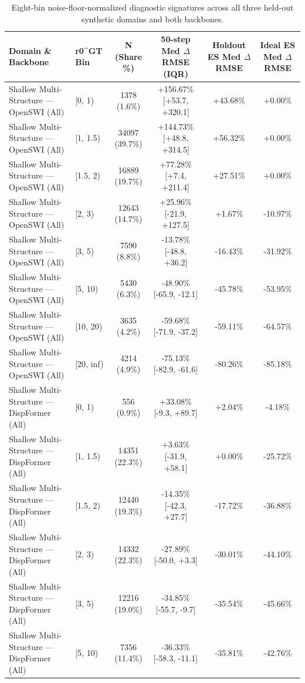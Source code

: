 \begin{table}[t]
\centering
\scriptsize
\caption{Eight-bin noise-floor-normalized diagnostic signatures across all three held-out synthetic domains and both backbones.}
\label{tab:supp_signature_bins}
\begin{tabular}{llcccc}
\toprule
Domain \& Backbone & r0^GT Bin & N (Share \%) & 50-step Med $\Delta$RMSE (IQR) & Holdout ES Med $\Delta$RMSE & Ideal ES Med $\Delta$RMSE \\
\midrule
Shallow Multi-Structure — OpenSWI (All) & [0, 1) & 1378 (1.6\%) & +156.67\% [+53.7, +320.1] & +43.68\% & +0.00\% \\
Shallow Multi-Structure — OpenSWI (All) & [1, 1.5) & 34097 (39.7\%) & +144.73\% [+48.8, +314.5] & +56.32\% & +0.00\% \\
Shallow Multi-Structure — OpenSWI (All) & [1.5, 2) & 16889 (19.7\%) & +77.28\% [+7.4, +211.4] & +27.51\% & +0.00\% \\
Shallow Multi-Structure — OpenSWI (All) & [2, 3) & 12643 (14.7\%) & +25.96\% [-21.9, +127.5] & +1.67\% & -10.97\% \\
Shallow Multi-Structure — OpenSWI (All) & [3, 5) & 7590 (8.8\%) & -13.78\% [-48.8, +36.2] & -16.43\% & -31.92\% \\
Shallow Multi-Structure — OpenSWI (All) & [5, 10) & 5430 (6.3\%) & -48.90\% [-65.9, -12.1] & -45.78\% & -53.95\% \\
Shallow Multi-Structure — OpenSWI (All) & [10, 20) & 3635 (4.2\%) & -59.68\% [-71.9, -37.2] & -59.11\% & -64.57\% \\
Shallow Multi-Structure — OpenSWI (All) & [20, inf) & 4214 (4.9\%) & -75.13\% [-82.9, -61.6] & -80.26\% & -85.18\% \\
Shallow Multi-Structure — DispFormer (All) & [0, 1) & 556 (0.9\%) & +33.08\% [-9.3, +89.7] & +2.04\% & -4.18\% \\
Shallow Multi-Structure — DispFormer (All) & [1, 1.5) & 14351 (22.3\%) & +3.63\% [-31.9, +58.1] & +0.00\% & -25.72\% \\
Shallow Multi-Structure — DispFormer (All) & [1.5, 2) & 12440 (19.3\%) & -14.35\% [-42.3, +27.7] & -17.72\% & -36.88\% \\
Shallow Multi-Structure — DispFormer (All) & [2, 3) & 14332 (22.3\%) & -27.89\% [-50.0, +3.3] & -30.01\% & -44.10\% \\
Shallow Multi-Structure — DispFormer (All) & [3, 5) & 12216 (19.0\%) & -34.85\% [-55.7, -9.7] & -35.54\% & -45.66\% \\
Shallow Multi-Structure — DispFormer (All) & [5, 10) & 7356 (11.4\%) & -36.33\% [-58.3, -11.1] & -35.81\% & -42.76\% \\

\end{tabular}
\end{table}
